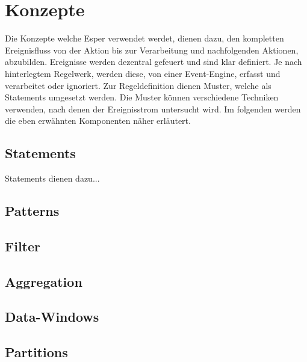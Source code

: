 \chapter{Konzepte}
Die Konzepte welche Esper verwendet werdet, dienen dazu, den kompletten Ereignisfluss von der Aktion bis zur Verarbeitung und nachfolgenden Aktionen, abzubilden.
Ereignisse werden dezentral gefeuert und sind klar definiert. Je nach hinterlegtem Regelwerk, werden diese, von einer Event-Engine, erfasst und verarbeitet oder ignoriert. Zur Regeldefinition dienen Muster, welche als Statements umgesetzt werden. Die Muster können verschiedene Techniken verwenden, nach denen der Ereignisstrom untersucht wird. Im folgenden werden die eben erwähnten Komponenten näher erläutert.

\section{Statements}

Statements dienen dazu...

\section{Patterns}

\section{Filter}

\section{Aggregation}

\section{Data-Windows}
\label{Data-Windows}

\section{Partitions}